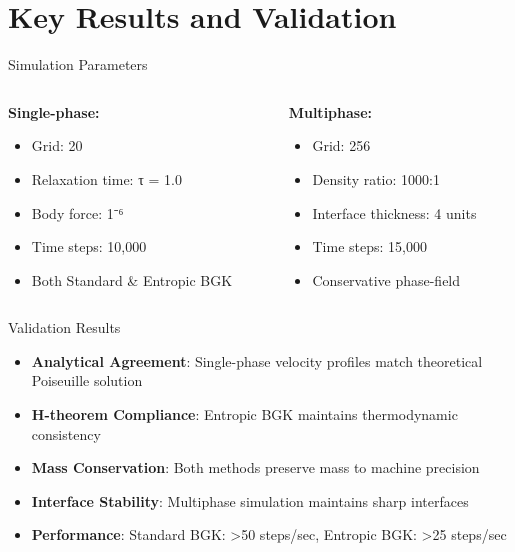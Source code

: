 \documentclass{beamer}
\begin{document}
\section{Key Results and Validation}

\begin{frame}{Simulation Parameters}
  \begin{columns}
    \begin{column}{0.5\textwidth}
      \textbf{Single-phase:}
      \begin{itemize}
        \item Grid: 20
        \item Relaxation time: τ = 1.0
        \item Body force: 1⁻⁶
        \item Time steps: 10,000
        \item Both Standard & Entropic BGK
      \end{itemize}
    \end{column}
    \begin{column}{0.5\textwidth}
      \textbf{Multiphase:}
      \begin{itemize}
        \item Grid: 256
        \item Density ratio: 1000:1
        \item Interface thickness: 4 units
        \item Time steps: 15,000
        \item Conservative phase-field
      \end{itemize}
    \end{column}
  \end{columns}
\end{frame}

\begin{frame}{Validation Results}
  \begin{itemize}
    \item \textbf{Analytical Agreement}: Single-phase velocity profiles match theoretical Poiseuille solution
    \item \textbf{H-theorem Compliance}: Entropic BGK maintains thermodynamic consistency
    \item \textbf{Mass Conservation}: Both methods preserve mass to machine precision
    \item \textbf{Interface Stability}: Multiphase simulation maintains sharp interfaces
    \item \textbf{Performance}: Standard BGK: >50 steps/sec, Entropic BGK: >25 steps/sec
  \end{itemize}
\end{frame}
\end{document}
